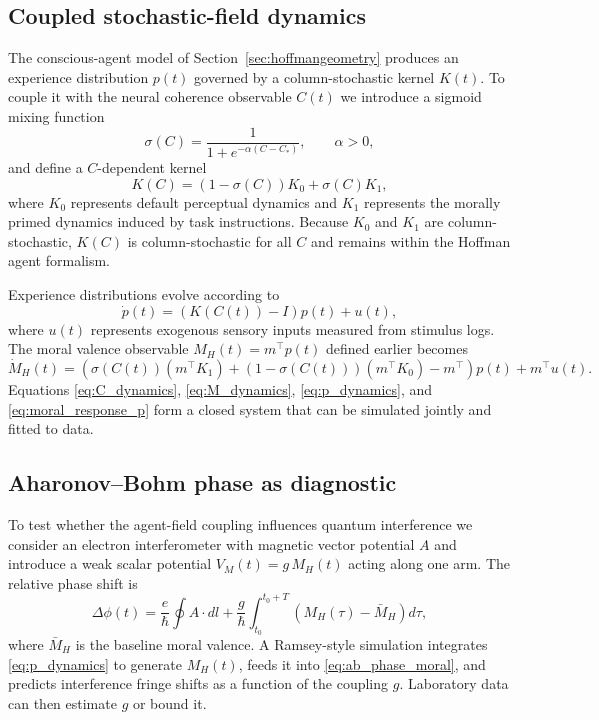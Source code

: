 \documentclass[12pt,a4paper]{article}
\theoremstyle{definition}
\begin{document}
\subsection{Coupled stochastic-field dynamics}

The conscious-agent model of Section~\ref{sec:hoffmangeometry} produces an experience distribution $p(t)$ governed by a column-stochastic kernel $K(t)$. To couple it with the neural coherence observable $C(t)$ we introduce a sigmoid mixing function
\begin{equation}
\sigma(C) = \frac{1}{1 + e^{-\alpha (C - C_\ast)}}, \qquad \alpha > 0,
\end{equation}
and define a $C$-dependent kernel
\begin{equation}
\label{eq:kernel_mixture}
K(C) = (1 - \sigma(C)) K_0 + \sigma(C) K_1,
\end{equation}
where $K_0$ represents default perceptual dynamics and $K_1$ represents the morally primed dynamics induced by task instructions. Because $K_0$ and $K_1$ are column-stochastic, $K(C)$ is column-stochastic for all $C$ and remains within the Hoffman agent formalism.

Experience distributions evolve according to
\begin{equation}
\label{eq:p_dynamics}
\dot{p}(t) = \left(K(C(t)) - I\right) p(t) + u(t),
\end{equation}
where $u(t)$ represents exogenous sensory inputs measured from stimulus logs. The moral valence observable $M_H(t) = m^\top p(t)$ defined earlier becomes
\begin{equation}
\label{eq:moral_response_p}
\dot{M}_H(t) = \left(\sigma(C(t)) (m^\top K_1) + (1 - \sigma(C(t))) (m^\top K_0) - m^\top \right) p(t) + m^\top u(t).
\end{equation}
Equations \eqref{eq:C_dynamics}, \eqref{eq:M_dynamics}, \eqref{eq:p_dynamics}, and \eqref{eq:moral_response_p} form a closed system that can be simulated jointly and fitted to data.

\subsection{Aharonov--Bohm phase as diagnostic}

To test whether the agent-field coupling influences quantum interference we consider an electron interferometer with magnetic vector potential $A$ and introduce a weak scalar potential $V_M(t) = g \, M_H(t)$ acting along one arm. The relative phase shift is\cite{AharonovBohm1959}
\begin{equation}
\label{eq:ab_phase_moral}
\Delta\phi(t) = \frac{e}{\hbar} \oint A \cdot dl + \frac{g}{\hbar} \int_{t_0}^{t_0 + T} \left(M_H(\tau) - \bar{M}_H\right) d\tau,
\end{equation}
where $\bar{M}_H$ is the baseline moral valence. A Ramsey-style simulation integrates \eqref{eq:p_dynamics} to generate $M_H(t)$, feeds it into \eqref{eq:ab_phase_moral}, and predicts interference fringe shifts as a function of the coupling $g$. Laboratory data can then estimate $g$ or bound it.
\end{document}
